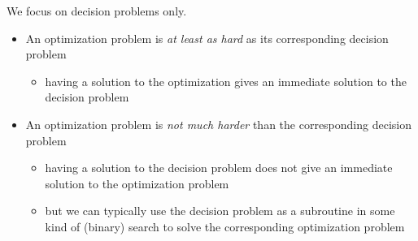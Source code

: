 We focus on decision problems only.
\begin{itemize}
\item An optimization problem is \emph{at least as hard} as its corresponding decision problem
\begin{itemize}
\item having a solution to the optimization gives an immediate solution to the decision problem
\end{itemize}
\item An optimization problem is \emph{not much harder} than the corresponding decision problem
\begin{itemize}
\item having a solution to the decision problem does not give an immediate solution to the optimization problem
\item but we can typically use the decision problem as a subroutine in some kind of (binary) search to solve the corresponding optimization problem
\end{itemize}
\end{itemize}



